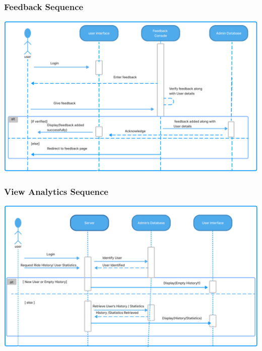 \documentclass[11pt]{article}
\begin{document}
\subsubsection{Feedback Sequence}
\begin{center}
  \includegraphics[scale=0.35]{sequence-diagram-images/feedback.png}
\end{center}

\subsubsection{View Analytics Sequence}
\begin{center}
  \includegraphics[scale=0.3]{sequence-diagram-images/analytics.png}
\end{center}
\end{document}
